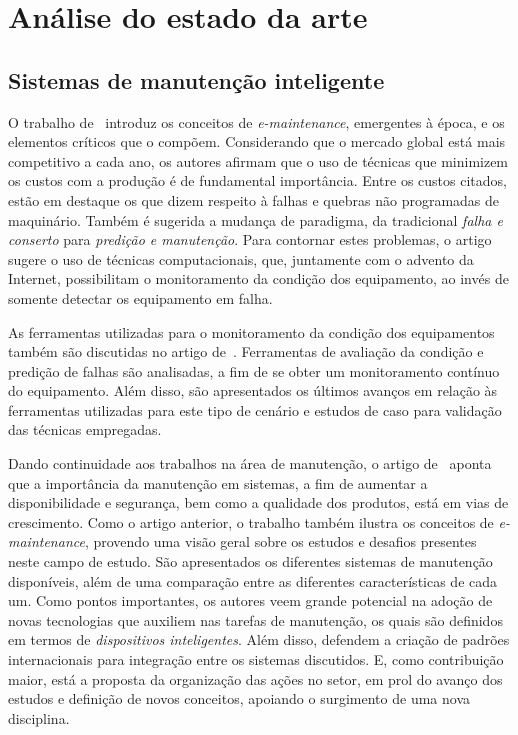 \chapter{Análise do estado da arte}



\section{Sistemas de manutenção inteligente}


O trabalho de~\cite{lee2006intelligent} introduz os conceitos de \textit{e-maintenance}, emergentes
à época, e os elementos críticos que o compõem. Considerando que o mercado global está mais
competitivo a cada ano, os autores afirmam que o uso de técnicas que minimizem os custos com a
produção é de fundamental importância. Entre os custos citados, estão em destaque os que dizem
respeito à falhas e quebras não programadas de maquinário. Também é sugerida a mudança de paradigma,
da tradicional \emph{falha e conserto} para \emph{predição e manutenção}. Para contornar estes
problemas, o artigo sugere o uso de técnicas computacionais, que, juntamente com o advento da
Internet, possibilitam o monitoramento da condição dos equipamento, ao invés de somente detectar os
equipamento em falha.

As ferramentas utilizadas para o monitoramento da condição dos equipamentos também são discutidas no
artigo de~\cite{lee2006intelligent}. Ferramentas de avaliação da condição e predição de falhas são
analisadas, a fim de se obter um monitoramento contínuo do equipamento. Além disso, são apresentados
os últimos avanços em relação às ferramentas utilizadas para este tipo de cenário e estudos de caso
para validação das técnicas empregadas.

Dando continuidade aos trabalhos na área de manutenção, o artigo de~\cite{muller2008concept} aponta
que a importância da manutenção em sistemas, a fim de aumentar a disponibilidade e segurança, bem
como a qualidade dos produtos, está em vias de crescimento. Como o artigo anterior, o trabalho
também ilustra os conceitos de \textit{e-maintenance}, provendo uma visão geral sobre os estudos e
desafios presentes neste campo de estudo. São apresentados os diferentes sistemas de manutenção
disponíveis, além de uma comparação entre as diferentes características de cada um. Como pontos
importantes, os autores veem grande potencial na adoção de novas tecnologias que auxiliem nas
tarefas de manutenção, os quais são definidos em termos de \emph{dispositivos inteligentes}. Além
disso, defendem a criação de padrões internacionais para integração entre os sistemas discutidos. E,
como contribuição maior, está a proposta da organização das ações no setor, em prol do avanço dos
estudos e definição de novos conceitos, apoiando o surgimento de uma nova disciplina.

